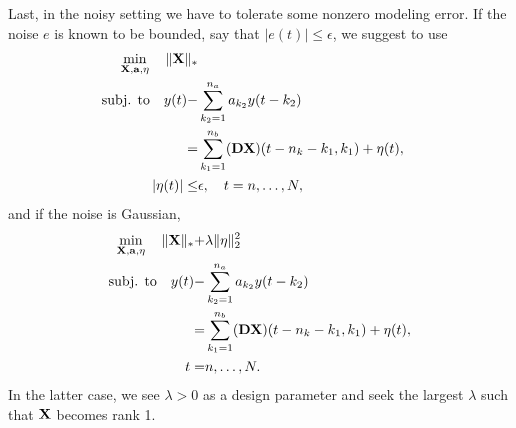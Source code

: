 \documentclass{ifacconf}
\newcommand{\DD}{{\bf D}}
\renewcommand{\aa}{{\bf a}}
\newcommand{\X}{{\bf X}}
\newcommand{\0}{{\bf 0}}
\renewcommand{\a}{a}
\def\subjto{{\mbox{subj. to}}}
\begin{document}
Last, in the noisy setting we have to tolerate some nonzero modeling
error. If the noise $e$ is known to be bounded, say that $|e(t)|\leq \epsilon$, we suggest to use
\begin{subequations}\label{eq:probform332}
\begin{align}
\min_{\X, \aa, {\bf \eta}}  \quad    \|\X\|_*  
\\ \nonumber
 \subjto \quad  y(t) -&\sum_{k_2=1}^{n_a} \a_{k_2}
 y(t-k_2)
\\  \label{eq:probformm33} = & \sum_{k_1=1}^{n_b} (\DD
\X)(t-n_k-k_1,k_1)+\eta(t), \\
 | \eta(t) | \leq &\epsilon, \quad 
  t=  n,\dots,N,
\end{align}\end{subequations}and if the noise is Gaussian,
\begin{subequations}\label{eq:probform32}
\begin{align}
\min_{\X, \aa, {\bf \eta}}  \quad    \|\X\|_*  + &\lambda \|{\bf \eta} \|_2^2 
\\ \nonumber
 \subjto \quad  y(t) -&\sum_{k_2=1}^{n_a} \a_{k_2}
 y(t-k_2)
\\  \label{eq:probformm3} = & \sum_{k_1=1}^{n_b} (\DD \X)(t-n_k-k_1,k_1)+\eta(t), \\
  t=&  n,\dots,N.
\end{align}\end{subequations}In the latter case, we see $\lambda>0$ as a design parameter  and seek the largest
$\lambda $ such that $\X$ becomes rank 1. 
\end{document}
